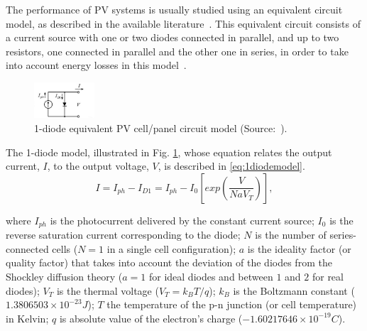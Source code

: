 \documentclass[journal]{IEEEtran}
\begin{document}
The performance of PV systems %
is usually studied using an equivalent circuit model, as described in the available literature~\cite{Yatimi,Saloux,Mellit}. This equivalent circuit consists of a current source with one or two diodes connected in parallel, and up to two resistors, one connected in parallel and the other one in series, in order to take into account energy losses in this model~\cite{Cubas}. 
\begin{figure}[h]
\includegraphics[width=0.20\textwidth]{equivckt1D}
\centering
\caption{1-diode equivalent PV cell/panel circuit model (Source:~\cite{Cubas}).}
\label{fig:equivckt}
\end{figure}
 
The 1-diode model, illustrated in Fig. \ref{fig:equivckt}, whose equation relates the output current, $I$, to the output voltage, $V$, is described in \eqref{eq:1diodemodel}. 
\begin{equation}
\label{eq:1diodemodel}
I = I_{ph}-I_{D1}=I_{ph}-I_{0}\left[ exp \left( \dfrac{V}{NaV_{T}} \right)  \right], 
\end{equation}

\noindent where $I_{ph}$ is the photocurrent delivered by the constant current source; $I_{0}$ is the reverse saturation current corresponding to the diode; $N$ is the number of series-connected cells ($N=1$ in a single cell configuration); $a$ is the ideality factor (or quality factor) that takes into account the deviation of the diodes from the Shockley diffusion theory ($a=1$ for ideal diodes and between $1$ and $2$ for real diodes); $V_{T}$ is the thermal voltage ($ V_{T}=k_{B}T/q $); $ k_{B} $ is the Boltzmann constant ($ 1.3806503\times10^{-23}J $); $T$ the temperature of the p-n junction (or cell temperature) in Kelvin; $q$ is absolute value of the electron's charge ($ -1.60217646\times10^{-19}C $).
\end{document}
